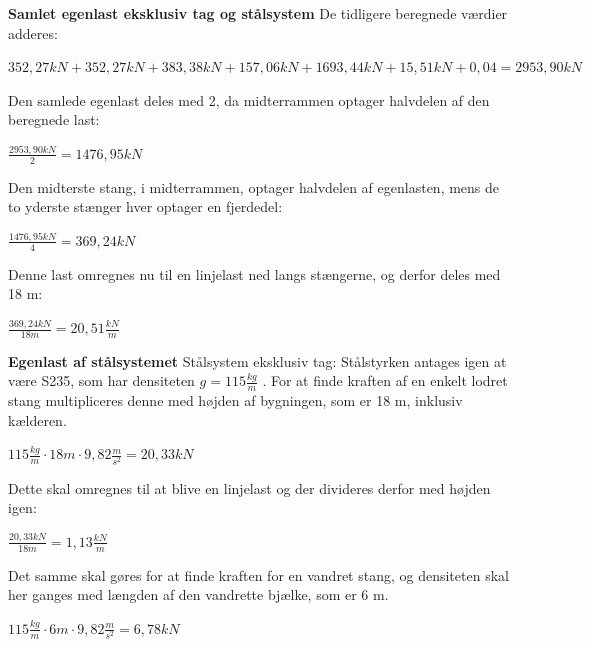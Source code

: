 \textbf{Samlet egenlast eksklusiv tag og stålsystem}
\newline
De tidligere beregnede værdier adderes:
\begin{center}
	$352,\!27 kN + 352,\!27 kN + 383,\!38 kN + 157,\!06 kN + 1693,\!44 kN + 15,\!51 kN + 0,\!04 = 2953,\!90 kN$
\end{center}

Den samlede egenlast deles med 2, da midterrammen optager halvdelen af den beregnede last:
\begin{center}
	$\frac{2953,\!90 kN}{2} = 1476,\!95 kN$
\end{center}

Den midterste stang, i midterrammen, optager halvdelen af egenlasten, mens de to yderste stænger hver optager en fjerdedel:
\begin{center}
	$\frac{1476,\!95 kN}{4} = 369,\!24 kN$
\end{center}

Denne last omregnes nu til en linjelast ned langs stængerne, og derfor deles med 18 m:
\begin{center}
	$\frac{369,\!24 kN}{18 m} = 20,\!51 \frac{kN}{m}$
\end{center}

\textbf{Egenlast af stålsystemet}
\newline
\newline
Stålsystem eksklusiv tag:
\newline
Stålstyrken antages igen at være S235, som har densiteten $g=115\frac{kg}{m}$ \citep{stabi}. For at finde kraften af en enkelt lodret stang multipliceres denne med højden af bygningen, som er 18 m, inklusiv kælderen.
\begin{center}
	$115\frac{kg}{m}\cdot 18 m \cdot 9,\!82\frac{m}{s^2} = 20,\!33 kN$
\end{center}

Dette skal omregnes til at blive en linjelast og der divideres derfor med højden igen:

\begin{center}
	$\frac{20,\!33 kN}{18m} = 1,\!13\frac{kN}{m}$
\end{center}

Det samme skal gøres for at finde kraften for en vandret stang, og densiteten skal her ganges med længden af den vandrette bjælke, som er 6 m.
\begin{center}
	$115\frac{kg}{m}\cdot 6 m \cdot 9,\!82\frac{m}{s^2} = 6,\!78  kN$
\end{center}

